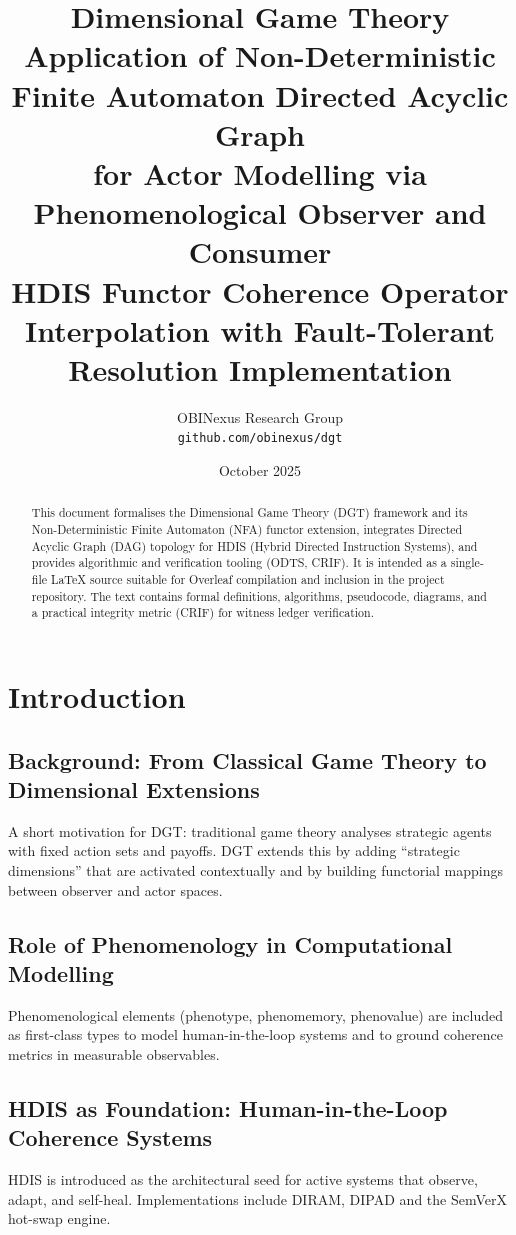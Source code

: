 \documentclass[12pt,a4paper]{article}
\title{\LARGE\bfseries Dimensional Game Theory \\
Application of Non-Deterministic Finite Automaton Directed Acyclic Graph \\
for Actor Modelling via Phenomenological Observer and Consumer \\
HDIS Functor Coherence Operator Interpolation with Fault-Tolerant Resolution Implementation}
\author{OBINexus Research Group \\
\texttt{github.com/obinexus/dgt}}
\date{October 2025}
\begin{document}
\maketitle
\begin{abstract}
This document formalises the Dimensional Game Theory (DGT) framework and its
Non-Deterministic Finite Automaton (NFA) functor extension, integrates
Directed Acyclic Graph (DAG) topology for HDIS (Hybrid Directed Instruction
Systems), and provides algorithmic and verification tooling (ODTS, CRIF).
It is intended as a single-file LaTeX source suitable for Overleaf compilation
and inclusion in the project repository. The text contains formal definitions,
algorithms, pseudocode, diagrams, and a practical integrity metric (CRIF) for
witness ledger verification.
\end{abstract}

\tableofcontents
\newpage

\section{Introduction}
\subsection{Background: From Classical Game Theory to Dimensional Extensions}
A short motivation for DGT: traditional game theory analyses strategic agents
with fixed action sets and payoffs. DGT extends this by adding ``strategic
dimensions'' that are activated contextually and by building functorial
mappings between observer and actor spaces.

\subsection{Role of Phenomenology in Computational Modelling}
Phenomenological elements (phenotype, phenomemory, phenovalue) are included
as first-class types to model human-in-the-loop systems and to ground
coherence metrics in measurable observables.

\subsection{HDIS as Foundation: Human-in-the-Loop Coherence Systems}
HDIS is introduced as the architectural seed for active systems that observe,
adapt, and self-heal. Implementations include DIRAM, DIPAD and the SemVerX
hot-swap engine.
\end{document}

